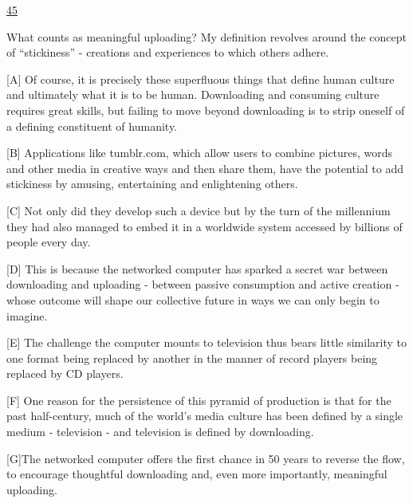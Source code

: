 \ul{45 \quad\quad\quad\quad\quad\quad\quad\quad\quad\quad\quad\quad}

What counts as meaningful uploading? My definition revolves around the concept of ``stickiness'' - creations and experiences to which others adhere.

\vspace{6pt}

[A] Of course, it is precisely these superfluous things that define human culture and ultimately what it is to be human. Downloading and consuming culture requires great skills, but failing to move beyond downloading is to strip oneself of a defining constituent of humanity.

[B] Applications like tumblr.com, which allow users to combine pictures, words and other media in creative ways and then share them, have the potential to add stickiness by amusing, entertaining and enlightening others.

[C] Not only did they develop such a device but by the turn of the millennium they had also managed to embed it in a worldwide system accessed by billions of people every day.

[D] This is because the networked computer has sparked a secret war between downloading and uploading - between passive consumption and active creation - whose outcome will shape our collective future in ways we can only begin to imagine.

[E] The challenge the computer mounts to television thus bears little similarity to one format being replaced by another in the manner of record players being replaced by CD players.

[F] One reason for the persistence of this pyramid of production is that for the past half-century, much of the world's media culture has been defined by a single medium - television - and television is defined by downloading.

[G]The networked computer offers the first chance in 50 years to reverse the flow, to encourage thoughtful downloading and, even more importantly, meaningful uploading.
